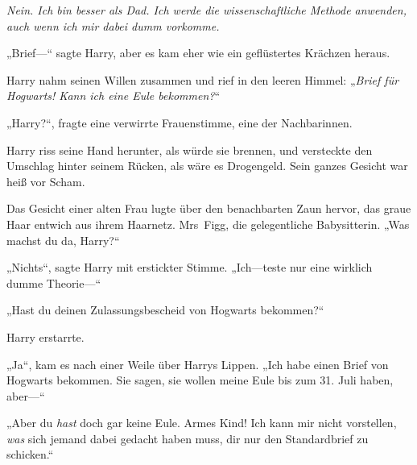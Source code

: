 \emph{Nein. Ich bin besser als Dad. Ich werde die wissenschaftliche Methode anwenden, auch wenn ich mir dabei dumm vorkomme.}

„Brief—“ sagte Harry, aber es kam eher wie ein geflüstertes Krächzen heraus.

Harry nahm seinen Willen zusammen und rief in den leeren Himmel: „\emph{Brief für Hogwarts! Kann ich eine Eule bekommen?}“

„Harry?“, fragte eine verwirrte Frauenstimme, eine der Nachbarinnen.

Harry riss seine Hand herunter, als würde sie brennen, und versteckte den Umschlag hinter seinem Rücken, als wäre es Drogengeld. Sein ganzes Gesicht war heiß vor Scham.

Das Gesicht einer alten Frau lugte über den benachbarten Zaun hervor, das graue Haar entwich aus ihrem Haarnetz. Mrs~Figg, die gelegentliche Babysitterin. „Was machst du da, Harry?“

„Nichts“, sagte Harry mit erstickter Stimme. „Ich—teste nur eine wirklich dumme Theorie—“

„Hast du deinen Zulassungsbescheid von Hogwarts bekommen?“

Harry erstarrte.

„Ja“, kam es nach einer Weile über Harrys Lippen. „Ich habe einen Brief von Hogwarts bekommen. Sie sagen, sie wollen meine Eule bis zum 31. Juli haben, aber—“

„Aber du \emph{hast} doch gar keine Eule. Armes Kind! Ich kann mir nicht vorstellen, \emph{was} sich jemand dabei gedacht haben muss, dir nur den Standardbrief zu schicken.“

